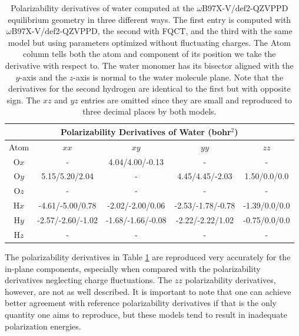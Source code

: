 \documentclass[journal=jctcce,manuscript=article]{achemso}
\begin{document}
\begin{table}[ht!]
  \begin{center}
  \begin{tabular}{ccccc}
      \multicolumn{5}{c}{Polarizability Derivatives of Water (bohr$^2$)} \\\hline
       Atom & $xx$ & $xy$ & $yy$ & $zz$ \\\hline
       O$x$ & -                 & 4.04/4.00/-0.13    & -                  & -  \\
       O$y$ & 5.15/5.20/2.04    & -                  & 4.45/4.45/-2.03    & 1.50/0.0/0.0  \\
       O$z$ & -                 & -                  & -                  & -  \\
       H$x$ & -4.61/-5.00/0.78  & -2.02/-2.00/0.06   & -2.53/-1.78/-0.78  & -1.39/0.0/0.0  \\
       H$y$ & -2.57/-2.60/-1.02 & -1.68/-1.66/-0.08  & -2.22/-2.22/1.02   & -0.75/0.0/0.0  \\
       H$z$ & -                 & -                  & -                  & -  \\\hline
  \end{tabular}
  \end{center}
  \vspace{-3mm}
  \caption{Polarizability derivatives of water computed at the $\omega$B97X-V/def2-QZVPPD equilibrium geometry in three different ways. The first entry is computed with $\omega$B97X-V/def2-QZVPPD, the second with FQCT, and the third with the same model but using parameters optimized without fluctuating charges. The Atom column tells both the atom and component of its position we take the derivative with respect to. The water monomer has its bisector aligned with the $y$-axis and the $z$-axis is normal to the water molecule plane. Note that the derivatives for the second hydrogen are identical to the first but with opposite sign. The $xz$ and $yz$ entries are omitted since they are small and reproduced to three decimal places by both models.}
  \label{tab:pol_derivs}
\end{table}

The polarizability derivatives in Table \ref{tab:pol_derivs} are reproduced very accurately for the in-plane components, especially when compared with the polarizability derivatives neglecting charge fluctuations. The $zz$ polarizability derivatives, however, are not as well described. It is important to note that one can achieve better agreement with reference polarizability derivatives if that is the only quantity one aims to reproduce, but these models tend to result in inadequate polarization energies.  
\end{document}
